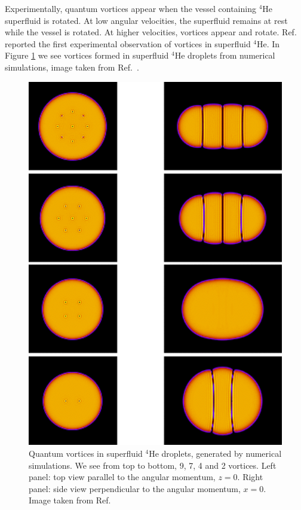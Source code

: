 Experimentally, quantum vortices appear when the vessel containing $^4$He superfluid is rotated. At low angular velocities, the superfluid remains at rest while the vessel is rotated. At higher velocities, vortices appear and rotate. Ref.\  \cite{PhysRevLett.43.214} reported the first experimental observation of vortices in superfluid $^4$He. In Figure \ref{fig:heliumvortices} we see vortices formed in superfluid $^4$He droplets from numerical simulations, image taken from Ref.\ \cite{ancio2015}.

\begin{figure}
	\centering
	\includegraphics[scale=0.5]{./figures/hevortices.png}
	\caption{Quantum vortices in superfluid $^4$He droplets, generated by numerical simulations. We see from top to bottom, 9, 7, 4 and 2 vortices. Left panel: top view parallel to the angular momentum, $z=0$. Right panel: side view perpendicular to the angular momentum,  $x=0$. Image taken from Ref.\ \cite{ancio2015}} %
	\label{fig:heliumvortices}
\end{figure} 


